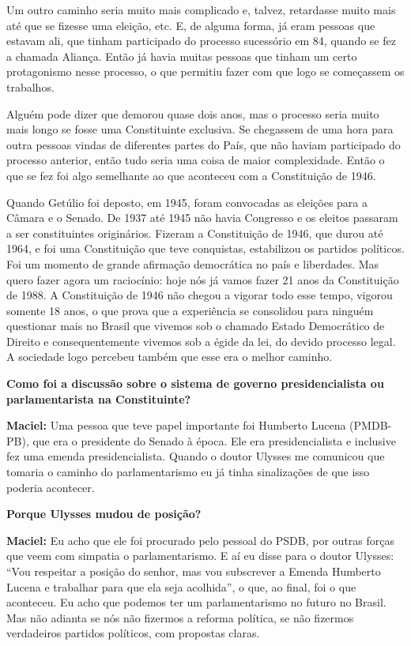 Um outro caminho seria muito mais complicado e, talvez, retardasse muito
mais até que se fizesse uma eleição, etc. E, de alguma forma, já eram
pessoas que estavam ali, que tinham participado do processo sucessório
em 84, quando se fez a chamada Aliança. Então já havia muitas pessoas
que tinham um certo protagonismo nesse processo, o que permitiu fazer
com que logo se começassem os trabalhos.

Alguém pode dizer que demorou quase dois anos, mas o processo seria
muito mais longo se fosse uma Constituinte exclusiva. Se chegassem de
uma hora para outra pessoas vindas de diferentes partes do País, que não
haviam participado do processo anterior, então tudo seria uma coisa de
maior complexidade. Então o que se fez foi algo semelhante ao que
aconteceu com a Constituição de 1946.

Quando Getúlio foi deposto, em 1945, foram convocadas as eleições para a
Câmara e o Senado. De 1937 até 1945 não havia Congresso e os eleitos
passaram a ser constituintes originários. Fizeram a Constituição de
1946, que durou até 1964, e foi uma Constituição que teve conquistas,
estabilizou os partidos políticos. Foi um momento de grande afirmação
democrática no país e liberdades. Mas quero fazer agora um raciocínio:
hoje nós já vamos fazer 21 anos da Constituição de 1988. A Constituição
de 1946 não chegou a vigorar todo esse tempo, vigorou somente 18 anos, o
que prova que a experiência se consolidou para ninguém questionar mais
no Brasil que vivemos sob o chamado Estado Democrático de Direito e
consequentemente vivemos sob a égide da lei, do devido processo legal. A
sociedade logo percebeu também que esse era o melhor caminho.

\textbf{Como foi a discussão sobre o sistema de governo presidencialista
ou parlamentarista na Constituinte?}

\textbf{Maciel:} Uma pessoa que teve papel importante foi Humberto
Lucena (PMDB-PB), que era o presidente do Senado à época. Ele era
presidencialista e inclusive fez uma emenda presidencialista. Quando o
doutor Ulysses me comunicou que tomaria o caminho do parlamentarismo eu
já tinha sinalizações de que isso poderia acontecer.

\textbf{Porque Ulysses mudou de posição?}

\textbf{Maciel:} Eu acho que ele foi procurado pelo pessoal do PSDB, por
outras forças que veem com simpatia o parlamentarismo. E aí eu disse
para o doutor Ulysses: ``Vou respeitar a posição do senhor, mas vou
subscrever a Emenda Humberto Lucena e trabalhar para que ela seja
acolhida'', o que, ao final, foi o que aconteceu. Eu acho que podemos
ter um parlamentarismo no futuro no Brasil. Mas não adianta se nós não
fizermos a reforma política, se não fizermos verdadeiros partidos
políticos, com propostas claras.

